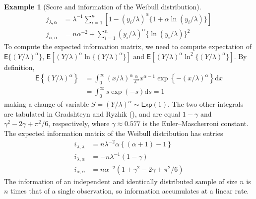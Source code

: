 \documentclass[
  11pt,
  letterpaper,
]{scrbook}
\theoremstyle{plain}
\theoremstyle{plain}
\theoremstyle{definition}
\newtheorem{example}{Example}[chapter]
\theoremstyle{definition}
\theoremstyle{remark}
\begin{document}
\begin{example}[Score and information of the Weibull
distribution]
\begin{align*}
j_{\lambda, \alpha} &= \lambda^{-1}\sum_{i=1}^n [1-(y_i/\lambda)^\alpha\{1+\alpha\ln(y_i/\lambda)\}] \\
j_{\alpha,\alpha} &= n\alpha^{-2} + \sum_{i=1}^n (y_i/\lambda)^\alpha \{\ln(y_i/\lambda)\}^2
\end{align*} To compute the expected information matrix, we need to
compute expectation of \(\mathsf{E}\{(Y/\lambda)^\alpha\}\),
\(\mathsf{E}[(Y/\lambda)^\alpha\ln\{(Y/\lambda)^\alpha\}]\) and
\(\mathsf{E}[(Y/\lambda)^\alpha\ln^2\{(Y/\lambda)^\alpha\}]\). By
definition, \begin{align*}
\mathsf{E}\left\{(Y/\lambda)^\alpha\right\} & = \int_0^\infty (x/\lambda)^\alpha \frac{\alpha}{\lambda^\alpha} x^{\alpha-1}\exp\left\{-(x/\lambda)^\alpha\right\} \mathrm{d} x \\
 &= \int_0^\infty s\exp(-s) \mathrm{d} s =1
\end{align*} making a change of variable
\(S = (Y/\lambda)^\alpha\sim \mathsf{Exp}(1)\). The two other integrals
are tabulated in Gradshteyn and Ryzhik
(), and are equal
\(1-\gamma\) and \(\gamma^2-2\gamma + \pi^2/6\), respectively, where
\(\gamma \approx 0.577\) is the Euler--Mascherroni constant. The
expected information matrix of the Weibull distribution has entries
\begin{align*}
i_{\lambda, \lambda} & = n \lambda^{-2}\alpha\left\{ (\alpha+1)-1\right\} \\
i_{\lambda, \alpha} & = -n\lambda^{-1} (1-\gamma) \\
i_{\alpha, \alpha} & = n\alpha^{-2}(1 + \gamma^2-2\gamma+\pi^2/6) 
\end{align*} The information of an independent and identically
distributed sample of size \(n\) is \(n\) times that of a single
observation, so information accumulates at a linear rate.

\end{example}
\end{document}
